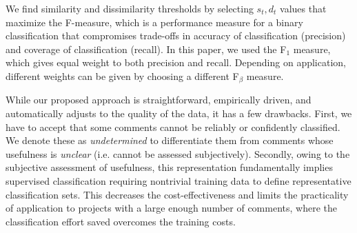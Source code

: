 We find similarity and dissimilarity thresholds by selecting $s_t,d_t$ values that maximize the F-measure,
which is a performance measure for a binary classification that compromises trade-offs in accuracy of classification (precision) and coverage of classification (recall).
In this paper, we used the F$_1$ measure, which gives equal weight to both precision and recall.
Depending on application, different weights can be given by choosing a different F$_\beta$ measure.

While our proposed approach is straightforward, empirically driven, and automatically adjusts to the quality of the data, it has a few drawbacks.
First, we have to accept that some comments cannot be reliably or confidently classified.
We denote these as \emph{undetermined} to differentiate them from comments whose usefulness is \emph{unclear} (i.e. cannot be assessed subjectively).
Secondly, owing to the subjective assessment of usefulness, this representation fundamentally implies supervised classification requiring nontrivial training data to define representative classification sets.
This decreases the cost-effectiveness and limits the practicality of application to projects with a large enough number of comments, where the classification effort saved overcomes the training costs.  








